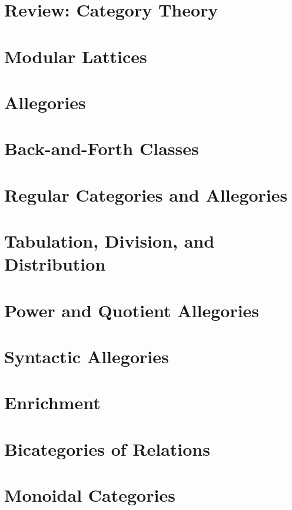 \documentclass[11pt]{book}
\begin{document}
\section*{Review: Category Theory}

\section{Modular Lattices}

\section{Allegories}

\section{Back-and-Forth Classes}

\section{Regular Categories and Allegories}

\section{Tabulation, Division, and Distribution}

\section{Power and Quotient Allegories}

\section{Syntactic Allegories}

\section{Enrichment}

\section{Bicategories of Relations}

\section{Monoidal Categories}
\end{document}
